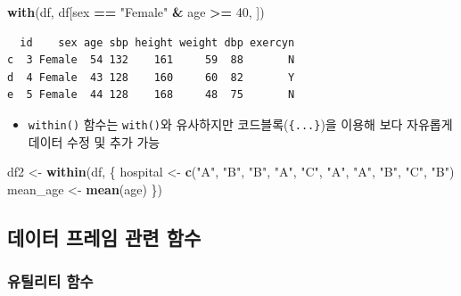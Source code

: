 \documentclass[
  11pt,
]{krantz}
\newenvironment{Shaded}{\begin{snugshade}}{\end{snugshade}}
\newcommand{\DecValTok}[1]{\textcolor[rgb]{0.06,0.06,0.06}{#1}}
\newcommand{\KeywordTok}[1]{\textcolor[rgb]{0.27,0.27,0.27}{\textbf{#1}}}
\newcommand{\NormalTok}[1]{#1}
\newcommand{\OperatorTok}[1]{\textcolor[rgb]{0.43,0.43,0.43}{\textbf{#1}}}
\newcommand{\StringTok}[1]{\textcolor[rgb]{0.5,0.5,0.5}{#1}}
\providecommand{\tightlist}{%
  \setlength{\itemsep}{0pt}\setlength{\parskip}{0pt}}
\begin{document}
\begin{Shaded}
\begin{Highlighting}[]
\KeywordTok{with}\NormalTok{(df, df[sex }\OperatorTok{==}\StringTok{ "Female"} \OperatorTok{&}\StringTok{ }\NormalTok{age }\OperatorTok{>=}\StringTok{ }\DecValTok{40}\NormalTok{, ])}
\end{Highlighting}
\end{Shaded}

\begin{verbatim}
  id    sex age sbp height weight dbp exercyn
c  3 Female  54 132    161     59  88       N
d  4 Female  43 128    160     60  82       Y
e  5 Female  44 128    168     48  75       N
\end{verbatim}

\normalsize

\begin{itemize}
\tightlist
\item
  \texttt{within()} 함수는 \texttt{with()}와 유사하지만 코드블록(\texttt{\{...\}})을 이용해 보다 자유롭게 데이터 수정 및 추가 가능
\end{itemize}

\footnotesize

\begin{Shaded}
\begin{Highlighting}[]
\NormalTok{df2 <-}\StringTok{ }\KeywordTok{within}\NormalTok{(df, \{}
\NormalTok{  hospital <-}\StringTok{ }\KeywordTok{c}\NormalTok{(}\StringTok{"A"}\NormalTok{, }\StringTok{"B"}\NormalTok{, }\StringTok{"B"}\NormalTok{, }\StringTok{"A"}\NormalTok{, }\StringTok{"C"}\NormalTok{, }
                \StringTok{"A"}\NormalTok{, }\StringTok{"A"}\NormalTok{, }\StringTok{"B"}\NormalTok{, }\StringTok{"C"}\NormalTok{, }\StringTok{"B"}\NormalTok{)}
\NormalTok{  mean_age <-}\StringTok{ }\KeywordTok{mean}\NormalTok{(age)}
\NormalTok{\})}
\end{Highlighting}
\end{Shaded}

\normalsize

\hypertarget{data-frame-function}{%
\subsection{데이터 프레임 관련 함수}\label{data-frame-function}}

\hypertarget{data-frame-utility}{%
\subsubsection*{유틸리티 함수}\label{data-frame-utility}}
\end{document}
